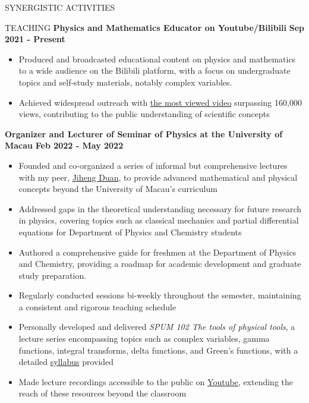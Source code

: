 \documentclass[10pt]{article} %
\begin{document}
\begin{section}{SYNERGISTIC ACTIVITIES}
\begin{section}{TEACHING}
\textbf{Physics and Mathematics Educator on Youtube/Bilibili} \hfill \textbf{Sep 2021 - Present}
\begin{itemize}[leftmargin=1.5em]
    \item Produced and broadcasted  educational content on physics and mathematics to a wide audience on the Bilibili platform, with a focus on undergraduate topics and self-study materials, notably complex variables.
    \item Achieved widespread outreach with \href{https://www.bilibili.com/video/BV1th411W7xu/}{the most viewed video} surpassing 160,000 views, contributing to the public understanding of scientific concepts
\end{itemize}

\newpage

\textbf{Organizer and Lecturer of Seminar of Physics at the University of Macau} \hfill \textbf{Feb 2022 - May 2022}
\begin{itemize}[leftmargin=1.5em]
    \item Founded and co-organized a series of informal but comprehensive lectures with my peer, \href{http://runawayfancy.me/}{Jiheng Duan}, to provide advanced mathematical and physical concepts beyond the University of Macau's curriculum
    \item Addressed gaps in the theoretical understanding necessary for future research in physics, covering topics such as classical mechanics and partial differential equations for Department of Physics and Chemistry students
    \item Authored a comprehensive guide for freshmen at the Department of Physics and Chemistry, providing a roadmap for academic development and graduate study preparation.
    \item Regularly conducted sessions bi-weekly throughout the semester, maintaining a consistent and rigorous teaching schedule
    \item Personally developed and delivered \textit{SPUM 102 The tools of physical tools}, a lecture series encompassing topics such as complex variables, gamma functions, integral transforms, delta functions, and Green's functions, with a detailed \href{https://github.com/Chisen-Lupus/Seminar-of-Physics-UM/blob/main/SPUM%20102%20The%20tools%20of%20physical%20tool.pdf}{syllabus} provided
    \item Made lecture recordings accessible to the public on \href{https://www.youtube.com/watch?v=nQkv03r-XeQ&list=PLV9fHDZW7hHWQ9rrAk7c9kdeV-Lqyt7pV&index=10}{Youtube}, extending the reach of these resources beyond the classroom
\end{itemize}

\end{section}

\end{section}
\end{document}
